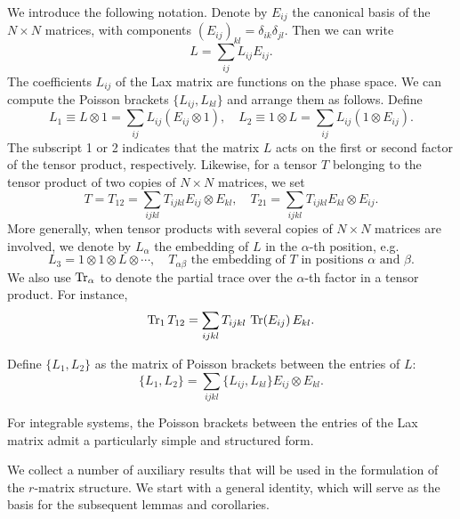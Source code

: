 We introduce the following notation. Denote by $E_{ij}$ the canonical basis of the $ N \times N $ matrices, with components $(E_{ij})_{kl} = \delta_{ik} \delta_{jl}$. Then we can write
\begin{equation}
    L = \sum_{ij} L_{ij} E_{ij}.
\end{equation}
The coefficients $ L_{ij} $ of the Lax matrix are functions on the phase space. We can compute the Poisson brackets $ \{L_{ij}, L_{kl}\} $ and arrange them as follows. Define
\begin{equation}
    L_1 \equiv L \otimes 1 = \sum_{ij} L_{ij} (E_{ij} \otimes 1), 
    \quad
    L_2 \equiv 1 \otimes L = \sum_{ij} L_{ij} (1 \otimes E_{ij}).
\end{equation}
The subscript 1 or 2 indicates that the matrix $ L $ acts on the first or second factor of the tensor product, respectively. 
Likewise, for a tensor $ T $ belonging to the tensor product of two copies of $ N \times N $ matrices, we set
\begin{equation}
    T = T_{12} = \sum_{ijkl} T_{ijkl} E_{ij} \otimes E_{kl},
    \quad
    T_{21} = \sum_{ijkl} T_{ijkl} E_{kl} \otimes E_{ij}.
\end{equation}
More generally, when tensor products with several copies of $ N \times N $ matrices are involved, we denote by $ L_\alpha $ the embedding of $ L $ in the $\alpha$-th position, e.g.
\begin{equation}
    L_3 = 1 \otimes 1 \otimes L \otimes \cdots,
    \quad
    T_{\alpha\beta} \text{ the embedding of } T \text{ in positions } \alpha \text{ and } \beta.
\end{equation}
We also use $ \Tr_\alpha $ to denote the partial trace over the $\alpha$-th factor in a tensor product. For instance,
\begin{equation}
    \Tr_1 T_{12} = \sum_{ijkl} T_{ijkl} \, \Tr(E_{ij}) \, E_{kl}.
\end{equation}
\begin{definition}
    Define $ \{L_1, L_2\} $ as the matrix of Poisson brackets between the entries of $ L $:
    \begin{equation}
        \{L_1, L_2\} = \sum_{ijkl} \{L_{ij}, L_{kl}\} E_{ij} \otimes E_{kl}.
    \end{equation}
\end{definition}
For integrable systems, the Poisson brackets between the entries of the Lax matrix admit a particularly simple and structured form.

We collect a number of auxiliary results that will be used in the formulation of the $r$-matrix structure. We start with a general identity, which will serve as the basis for the subsequent lemmas and corollaries.

